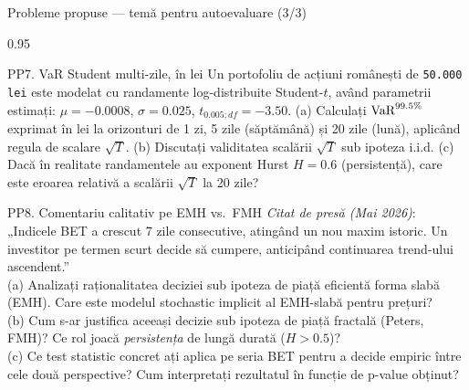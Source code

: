\documentclass[9pt, aspectratio=169, t]{beamer}
\begin{document}
\begin{frame}[shrink=10]{Probleme propuse --- temă pentru autoevaluare (3/3)}
\begin{cminipage}{0.95\textwidth}
\begin{block}{PP7. VaR Student multi-zile, în lei}
Un portofoliu de acțiuni românești de \texttt{50.000 lei} este modelat cu randamente log-distribuite Student-$t$, având parametrii estimați: $\mu=-0.0008$, $\sigma=0.025$, $t_{0.005;df}=-3.50$. (a) Calculați $\text{VaR}^{99.5\%}$ exprimat în lei la orizonturi de 1 zi, 5 zile (săptămână) și 20 zile (lună), aplicând regula de scalare $\sqrt T$. (b) Discutați validitatea scalării $\sqrt T$ sub ipoteza i.i.d. (c) Dacă în realitate randamentele au exponent Hurst $H=0.6$ (persistență), care este eroarea relativă a scalării $\sqrt T$ la 20 zile?
\end{block}
\begin{block}{PP8. Comentariu calitativ pe EMH vs.\ FMH}
\emph{Citat de presă (Mai 2026)}: „Indicele BET a crescut 7 zile consecutive, atingând un nou maxim istoric. Un investitor pe termen scurt decide să cumpere, anticipând continuarea trend-ului ascendent.''\\[0.3em]
(a) Analizați raționalitatea deciziei sub ipoteza de piață eficientă forma slabă (EMH). Care este modelul stochastic implicit al EMH-slabă pentru prețuri? \\
(b) Cum s-ar justifica aceeași decizie sub ipoteza de piață fractală (Peters, FMH)? Ce rol joacă \emph{persistența} de lungă durată ($H>0.5$)?\\
(c) Ce test statistic concret ați aplica pe seria BET pentru a decide empiric între cele două perspective? Cum interpretați rezultatul în funcție de p-value obținut?
\end{block}
\end{cminipage}
\end{frame}
\end{document}
